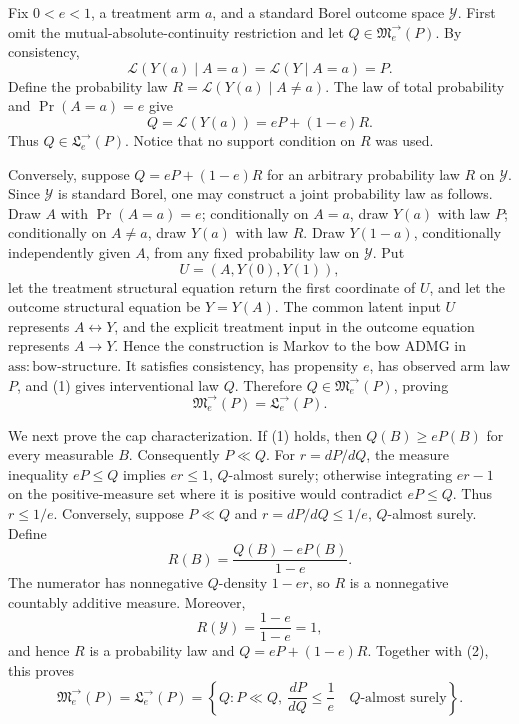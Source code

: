 Fix \(0<e<1\), a treatment arm \(a\), and a standard Borel outcome space \(\mathcal Y\).   First omit the mutual-absolute-continuity restriction and let \(Q\in\mathfrak M^{\to}_e(P)\).  By consistency,
\[
 \mathcal L(Y(a)\mid A=a)=\mathcal L(Y\mid A=a)=P.
\]
Define the probability law \(R=\mathcal L(Y(a)\mid A\ne a)\).  The law of total probability and \(\Pr(A=a)=e\) give
\[
 Q=\mathcal L(Y(a))=eP+(1-e)R. \tag{1}
\]
Thus \(Q\in\mathfrak L^{\to}_e(P)\).  Notice that no support condition on \(R\) was used.

Conversely, suppose \(Q=eP+(1-e)R\) for an arbitrary probability law \(R\) on \(\mathcal Y\).  Since \(\mathcal Y\) is standard Borel, one may construct a joint probability law as follows.  Draw \(A\) with \(\Pr(A=a)=e\); conditionally on \(A=a\), draw \(Y(a)\) with law \(P\); conditionally on \(A\ne a\), draw \(Y(a)\) with law \(R\).  Draw \(Y(1-a)\), conditionally independently given \(A\), from any fixed probability law on \(\mathcal Y\).  Put
\[
 U=(A,Y(0),Y(1)),
\]
let the treatment structural equation return the first coordinate of \(U\), and let the outcome structural equation be \(Y=Y(A)\).  The common latent input \(U\) represents \(A\leftrightarrow Y\), and the explicit treatment input in the outcome equation represents \(A\to Y\).  Hence the construction is Markov to the bow ADMG in \(\mathrm{ass:bow\text{-}structure}\).  It satisfies consistency, has propensity \(e\), has observed arm law \(P\), and (1) gives interventional law \(Q\).  Therefore \(Q\in\mathfrak M^{\to}_e(P)\), proving
\[
 \mathfrak M^{\to}_e(P)=\mathfrak L^{\to}_e(P). \tag{2}
\]

We next prove the cap characterization.  If (1) holds, then \(Q(B)\ge eP(B)\) for every measurable \(B\).  Consequently \(P\ll Q\).  For \(r=dP/dQ\), the measure inequality \(eP\le Q\) implies \(er\le1\), \(Q\)-almost surely; otherwise integrating \(er-1\) on the positive-measure set where it is positive would contradict \(eP\le Q\).  Thus \(r\le1/e\).  Conversely, suppose \(P\ll Q\) and \(r=dP/dQ\le1/e\), \(Q\)-almost surely.  Define
\[
 R(B)=\frac{Q(B)-eP(B)}{1-e}.
\]
The numerator has nonnegative \(Q\)-density \(1-er\), so \(R\) is a nonnegative countably additive measure.  Moreover,
\[
 R(\mathcal Y)=\frac{1-e}{1-e}=1,
\]
and hence \(R\) is a probability law and \(Q=eP+(1-e)R\).  Together with (2), this proves
\[
 \mathfrak M^{\to}_e(P)=\mathfrak L^{\to}_e(P)
 =\left\{Q:P\ll Q,\ \frac{dP}{dQ}\le\frac1e\quad Q\text{-almost surely}\right\}. \tag{3}
\]